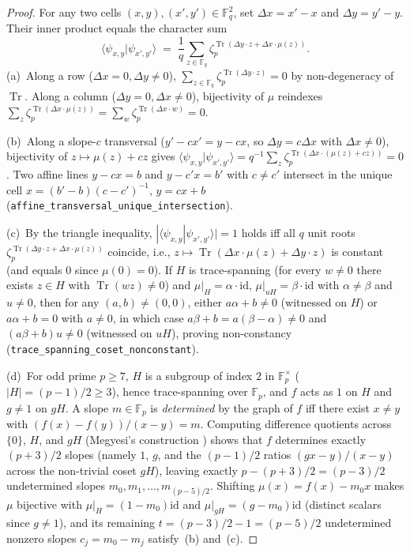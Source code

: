 \documentclass[11pt,reqno]{amsart}
\theoremstyle{definition}
\newcommand{\FF}{\mathbb{F}}
\newcommand{\Tr}{\operatorname{Tr}}
\newcommand{\lid}[1]{{\footnotesize\nolinkurl{#1}}}
\begin{document}
\begin{proof}
For any two cells $(x, y), (x', y') \in \FF_q^2$, set $\Delta x = x' - x$ and
$\Delta y = y' - y$. Their inner product equals the character sum
\[
  \langle \psi_{x,y} | \psi_{x',y'} \rangle
  \;=\; \frac{1}{q} \sum_{z \in \FF_q}
    \zeta_p^{\Tr(\Delta y \cdot z + \Delta x \cdot \mu(z))}.
\]
(a)~Along a row ($\Delta x = 0, \Delta y \ne 0$), $\sum_{z \in \FF_q}
\zeta_p^{\Tr(\Delta y \cdot z)} = 0$ by non-degeneracy of $\Tr$. Along a column
($\Delta y = 0, \Delta x \ne 0$), bijectivity of $\mu$ reindexes $\sum_z
\zeta_p^{\Tr(\Delta x \cdot \mu(z))} = \sum_w \zeta_p^{\Tr(\Delta x \cdot w)} = 0$.

(b)~Along a slope-$c$ transversal ($y' - cx' = y - cx$, so $\Delta y = c\Delta x$ with
$\Delta x \ne 0$), bijectivity of $z \mapsto \mu(z) + cz$ gives
$\langle \psi_{x,y} | \psi_{x',y'} \rangle = q^{-1}\sum_z
\zeta_p^{\Tr(\Delta x \cdot (\mu(z) + cz))} = 0$. Two affine lines $y - cx = b$ and
$y - c'x = b'$ with $c \ne c'$ intersect in the unique cell $x = (b' - b)(c - c')^{-1}$,
$y = cx + b$ (\lid{affine_transversal_unique_intersection}).

(c)~By the triangle inequality, $|\langle \psi_{x,y}|\psi_{x',y'}\rangle| = 1$ holds iff
all $q$ unit roots $\zeta_p^{\Tr(\Delta y \cdot z + \Delta x \cdot \mu(z))}$ coincide,
i.e., $z \mapsto \Tr(\Delta x \cdot \mu(z) + \Delta y \cdot z)$ is constant (and equals
$0$ since $\mu(0) = 0$). If $H$ is trace-spanning (for every $w \ne 0$ there exists
$z \in H$ with $\Tr(wz) \ne 0$) and $\mu|_H = \alpha \cdot \mathrm{id}$, $\mu|_{uH} =
\beta \cdot \mathrm{id}$ with $\alpha \ne \beta$ and $u \ne 0$, then for any
$(a, b) \ne (0,0)$, either $a\alpha + b \ne 0$ (witnessed on $H$) or $a\alpha + b = 0$
with $a \ne 0$, in which case $a\beta + b = a(\beta - \alpha) \ne 0$ and $(a\beta + b)u
\ne 0$ (witnessed on $uH$), proving non-constancy (\lid{trace_spanning_coset_nonconstant}).

(d)~For odd prime $p \ge 7$, $H$ is a subgroup of index $2$ in $\FF_p^\times$ ($|H| =
(p-1)/2 \ge 3$), hence trace-spanning over $\FF_p$, and $f$ acts as $1$ on $H$ and
$g \ne 1$ on $gH$. A slope $m \in \FF_p$ is \emph{determined} by the graph of $f$ iff
there exist $x \ne y$ with $(f(x)-f(y))/(x-y) = m$. Computing difference quotients across
$\{0\}$, $H$, and $gH$ (Megyesi's construction \cite{redei1973lacunary,
szonyi1996directions,blokhuis1999slopes}) shows that $f$ determines exactly $(p+3)/2$
slopes (namely $1$, $g$, and the $(p-1)/2$ ratios $(gx - y)/(x - y)$ across the
non-trivial coset $gH$), leaving exactly $p - (p+3)/2 = (p-3)/2$ undetermined slopes
$m_0, m_1, \dots, m_{(p-5)/2}$. Shifting $\mu(x) = f(x) - m_0 x$ makes $\mu$ bijective
with $\mu|_H = (1 - m_0)\mathrm{id}$ and $\mu|_{gH} = (g - m_0)\mathrm{id}$ (distinct
scalars since $g \ne 1$), and its remaining $t = (p-3)/2 - 1 = (p-5)/2$ undetermined
nonzero slopes $c_j = m_0 - m_j$ satisfy~(b) and~(c).
\end{proof}
\end{document}
